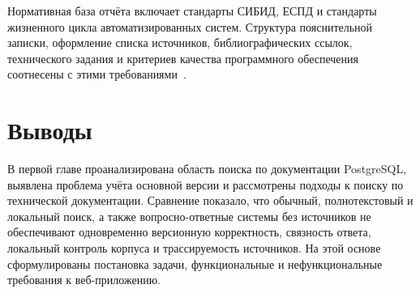 Нормативная база отчёта включает стандарты СИБИД, ЕСПД и стандарты жизненного цикла автоматизированных систем. Структура пояснительной записки, оформление списка источников, библиографических ссылок, технического задания и критериев качества программного обеспечения соотнесены с этими требованиями~\cite{gost-7-32-2017,gost-r-7-0-100-2018,gost-r-7-0-5-2008,gost-19-201-78,gost-34-601-90,gost-34-602-89,gost-r-iso-25010-2015}.

\section{Выводы}

В первой главе проанализирована область поиска по документации PostgreSQL, выявлена проблема учёта основной версии и рассмотрены подходы к поиску по технической документации. Сравнение показало, что обычный, полнотекстовый и локальный поиск, а также вопросно-ответные системы без источников не обеспечивают одновременно версионную корректность, связность ответа, локальный контроль корпуса и трассируемость источников. На этой основе сформулированы постановка задачи, функциональные и нефункциональные требования к веб-приложению.
